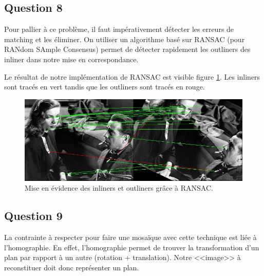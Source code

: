 \documentclass{article}
\begin{document}
\subsection{Question 8}
Pour pallier à ce problème, il faut impérativement détecter les erreurs de matching et les éliminer.
On utiliser un algorithme basé sur RANSAC (pour RANdom SAmple Consensus) permet de détecter rapidement les
outliners des inliner dans notre mise en correspondance. 

Le résultat de notre implémentation de RANSAC est visible figure \ref{ransac}. Les inliners sont tracés en
vert tandis que les outliners sont tracés en rouge.

\begin{figure}[!ht]
    \center
    \includegraphics[width=1\textwidth]{img/resultat_ransac.jpg}
    \caption{Mise en évidence des inliners et outliners grâce à RANSAC.}
    \label{ransac}
\end{figure}

\subsection{Question 9}
La contrainte à respecter pour faire une mosaïque avec cette technique est liée à l'homographie. En effet,
l'homographie permet de trouver la transformation d'un plan par rapport à un autre (rotation + translation).
Notre <<image>> à reconstituer doit donc représenter un plan.
\end{document}
